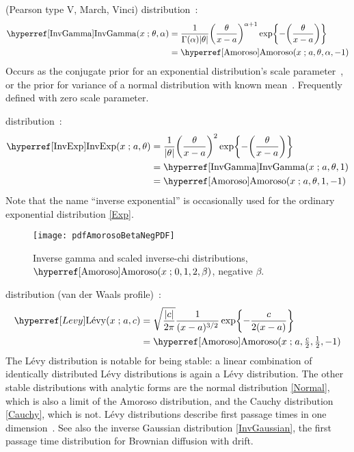  (Pearson type V, March, Vinci) distribution~\cite{Pearson1901, Johnson1994}:
\begin{align}
\label{InvGamma}
\opr{InvGamma}(x \given \theta, \alpha) 
&= \frac{1}{\Gamma(\alpha) |\theta|} \Left(\frac{\theta}{x-a}\Right)^{\alpha+1} 
 \exp\Left\{-\Left( \frac{\theta}{x-a}   \Right)\Right\}  \checked
\\
&=  \opr{Amoroso}(x\given  a, \theta, \alpha, -1) \notag  \checked
\end{align}
Occurs as the conjugate prior for an exponential distribution's scale parameter~\cite{Johnson1994}, or the prior for variance of a  normal distribution with known mean~\cite{Gelman2004}. Frequently defined with zero scale parameter.


 distribution~\cite{Kleiber2003}:
\begin{align}
\label{InvExp}
\opr{InvExp}(x \given a, \theta) 
&= \frac{1}{|\theta|} \Left(\frac{\theta}{x-a }\Right)^2  \exp\Left\{-\Left( \frac{\theta}{x-a}   \Right)\Right\}   \checked \\
&=  \opr{InvGamma}(x\given a,  \theta, 1)  \checked \notag \\
&=  \opr{Amoroso}(x\given  a, \theta, 1, -1) \checked \notag 
\end{align}
Note that the name ``inverse exponential'' is occasionally used for the ordinary exponential distribution \eqref{Exp}.


\begin{figure}[t]
\begin{center}
\texttt{[image: pdfAmorosoBetaNegPDF]}
\end{center}
\caption[Inverse gamma and scaled inverse-chi distributions]{Inverse gamma and scaled inverse-chi distributions, $\opr{Amoroso}(x\given 0,1,2,\beta)$, negative $\beta$.}
\end{figure}




 distribution (van der Waals profile)~\cite{Feller1971}: 
\begin{align}
\label{Levy}
\Levy(x \given a, c) 
&= \sqrt{\frac{|c|}{2\pi}} \frac{1}{(x-a)^{3/2}}  \exp\Left\{-\frac{c}{2(x-a)}\Right\}  \checked
\\
&=  \opr{Amoroso}(x\given  a, \tfrac{c}{2}, \tfrac{1}{2}, -1) \checked \notag 
\end{align}
The L\'{e}vy distribution is notable for being stable:  a linear combination of identically distributed  L\'{e}vy distributions is again a  L\'{e}vy distribution. The other stable distributions with analytic forms are the normal distribution \eqref{Normal}, which is also a limit of the Amoroso distribution, and the Cauchy distribution \eqref{Cauchy}, which is not. L\'{e}vy distributions describe first passage times in one dimension~\cite{Feller1971}. See also the inverse Gaussian distribution \eqref{InvGaussian}, the  first passage time distribution for Brownian diffusion with drift.


